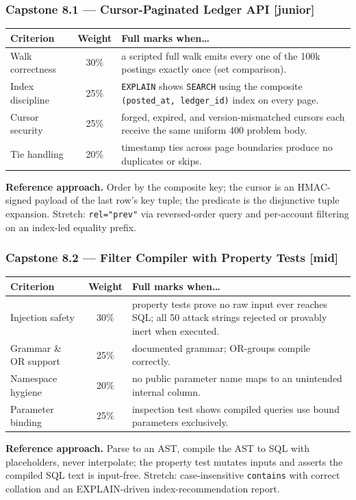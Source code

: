 \subsubsection*{Capstone 8.1 --- Cursor-Paginated Ledger API [junior]}
\begin{center}\small
\begin{tabularx}{\textwidth}{l c X}
\toprule
\textbf{Criterion} & \textbf{Weight} & \textbf{Full marks when\ldots} \\
\midrule
Walk correctness & 30\% & a scripted full walk emits every one of the 100k postings exactly once (set comparison). \\
Index discipline & 25\% & \texttt{EXPLAIN} shows \texttt{SEARCH} using the composite \texttt{(posted\_at, ledger\_id)} index on every page. \\
Cursor security & 25\% & forged, expired, and version-mismatched cursors each receive the same uniform 400 problem body. \\
Tie handling & 20\% & timestamp ties across page boundaries produce no duplicates or skips. \\
\bottomrule
\end{tabularx}
\end{center}
\textbf{Reference approach.} Order by the composite key; the cursor is an
HMAC-signed payload of the last row's key tuple; the predicate is the
disjunctive tuple expansion. Stretch: \texttt{rel="prev"} via reversed-order
query and per-account filtering on an index-led equality prefix.

\subsubsection*{Capstone 8.2 --- Filter Compiler with Property Tests [mid]}
\begin{center}\small
\begin{tabularx}{\textwidth}{l c X}
\toprule
\textbf{Criterion} & \textbf{Weight} & \textbf{Full marks when\ldots} \\
\midrule
Injection safety & 30\% & property tests prove no raw input ever reaches SQL; all 50 attack strings rejected or provably inert when executed. \\
Grammar \& OR support & 25\% & documented grammar; OR-groups compile correctly. \\
Namespace hygiene & 20\% & no public parameter name maps to an unintended internal column. \\
Parameter binding & 25\% & inspection test shows compiled queries use bound parameters exclusively. \\
\bottomrule
\end{tabularx}
\end{center}
\textbf{Reference approach.} Parse to an AST, compile the AST to SQL with
placeholders, never interpolate; the property test mutates inputs and
asserts the compiled SQL text is input-free. Stretch: case-insensitive
\texttt{contains} with correct collation and an EXPLAIN-driven
index-recommendation report.

